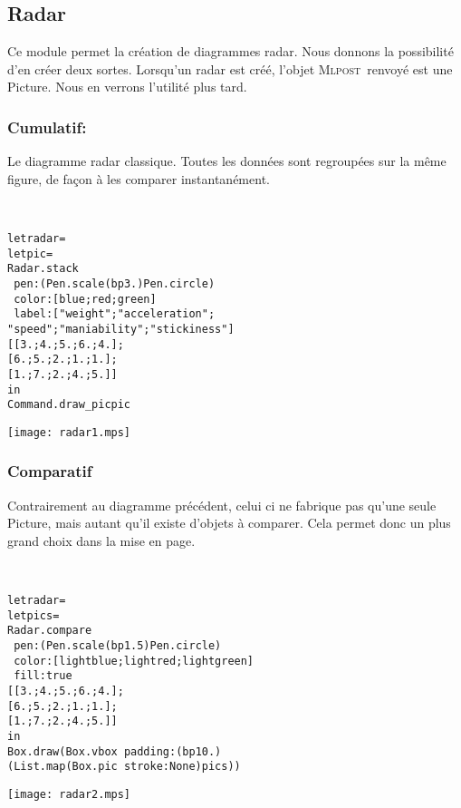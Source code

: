 \documentclass[a4paper,12pt]{article}
\newcommand{\mlpost}{\textsc{Mlpost}}
\begin{document}
\subsection{Radar}
Ce module permet la création de diagrammes radar.
Nous donnons la possibilité d'en créer deux sortes.
Lorsqu'un radar est créé, l'objet \mlpost\ renvoyé est une Picture.
Nous en verrons l'utilité plus tard.

\subsubsection{Cumulatif:}
Le diagramme radar classique. Toutes les données sont regroupées sur la même figure, de façon à les comparer instantanément. 

~\\

\begin{minipage}{0.5\linewidth}
  \begin{alltt}
    let radar =
    let pic =
    Radar.stack
    ~pen:(Pen.scale (bp 3.) Pen.circle)
    ~color:[blue;red;green]
    ~label:["weight";"acceleration";
      "speed";"maniability";"stickiness"]
    [[3.;4.;5.;6.;4.];
      [6.;5.;2.;1.;1.];
      [1.;7.;2.;4.;5.]]
    in
    Command.draw_pic pic
  \end{alltt}
\end{minipage}
\begin{minipage}{0.5\linewidth}
\begin{center}
\texttt{[image: radar1.mps]}
\end{center}
\end{minipage}

\subsubsection{Comparatif}
Contrairement au diagramme précédent, celui ci ne fabrique pas qu'une seule Picture, mais autant qu'il existe d'objets à comparer. Cela permet donc un plus grand choix dans la mise en page.

~\\

\begin{minipage}{0.5\linewidth}
  \begin{alltt}
    let radar =
    let pics =
    Radar.compare
    ~pen:(Pen.scale (bp 1.5) Pen.circle)
    ~color:[lightblue;lightred;lightgreen] 
    ~fill:true
    [[3.;4.;5.;6.;4.];
      [6.;5.;2.;1.;1.];
      [1.;7.;2.;4.;5.]]
    in
    Box.draw (Box.vbox ~padding:(bp 10.) 
    (List.map (Box.pic ~stroke:None) pics))

  \end{alltt}
\end{minipage}
\begin{minipage}{0.5\linewidth}
\begin{center}
\texttt{[image: radar2.mps]}
\end{center}
\end{minipage}
\end{document}
